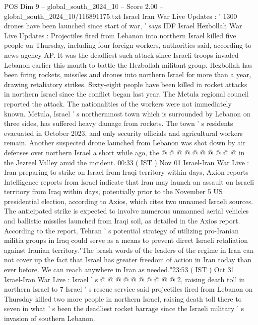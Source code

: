 \begin{textsample}{POS Dim 9 – global\_south\_2024\_10 – Score 2.00 – global\_south\_2024\_10/116891175.txt}  \label{ex:f9_pos_167}
Israel Iran War Live Updates : ' 1300 drones have been launched since start of war, ' says IDF Israel Hezbollah War Live Updates : Projectiles fired from Lebanon into northern Israel killed five people on Thursday, including four foreign workers, authorities said, according to news agency AP.
It was the deadliest such attack since Israeli troops invaded Lebanon earlier this month to battle the Hezbollah militant group.
Hezbollah has been firing rockets, missiles and drones into northern Israel for more than a year, drawing retaliatory strikes.
Sixty-eight people have been killed in rocket attacks in northern Israel since the conflict began last year.
The Metula regional council reported the attack.
The nationalities of the workers were not immediately known.
Metula, Israel ' s northernmost town which is surrounded by Lebanon on three sides, has suffered heavy damage from rockets.
The town ' s residents evacuated in October 2023, and only security officials and agricultural workers remain.
Another suspected drone launched from Lebanon was shot down by air defenses over northern Israel a short while ago, the @ @ @ @ @ @ @ @ @ @ in the Jezreel Valley amid the incident. 00:33 ( IST ) Nov 01 Israel-Iran War Live : Iran preparing to strike on Israel from Iraqi territory within days, Axion reports Intelligence reports from Israel indicate that Iran may launch an assault on Israeli territory from Iraq within days, potentially prior to the November 5 US presidential election, according to Axios, which cites two unnamed Israeli sources.
The anticipated strike is expected to involve numerous unmanned aerial vehicles and ballistic missiles launched from Iraqi soil, as detailed in the Axios report.
According to the report, Tehran ' s potential strategy of utilizing pro-Iranian militia groups in Iraq could serve as a means to prevent direct Israeli retaliation against Iranian territory."The brash words of the leaders of the regime in Iran can not cover up the fact that Israel has greater freedom of action in Iran today than ever before.
We can reach anywhere in Iran as needed."23:53 ( IST ) Oct 31 Israel-Iran War Live : Israel ' s @ @ @ @ @ @ @ @ @ @ 2, raising death toll in northern Israel to 7 Israel ' s rescue service said projectiles fired from Lebanon on Thursday killed two more people in northern Israel, raising death toll there to seven in what ' s been the deadliest rocket barrage since the Israeli military ' s invasion of southern Lebanon.

\end{textsample}
